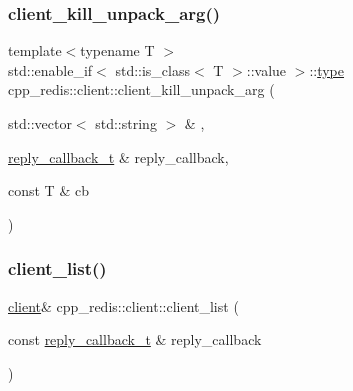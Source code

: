 \mbox{\label{classcpp__redis_1_1client_ab07713bcc08277292f6dc64ae89c1134}} 
\subsubsection{\texorpdfstring{client\+\_\+kill\+\_\+unpack\+\_\+arg()}{client\_kill\_unpack\_arg()}\hspace{0.1cm}{\footnotesize\ttfamily [4/4]}}
{\footnotesize\ttfamily template$<$typename T $>$ \\
std\+::enable\+\_\+if$<$ std\+::is\+\_\+class$<$ T $>$\+::value $>$\+::\hyperlink{classcpp__redis_1_1client_ac284ea9a5c0e95d49a675403aaf4847c}{type} cpp\+\_\+redis\+::client\+::client\+\_\+kill\+\_\+unpack\+\_\+arg (\begin{DoxyParamCaption}\item[{std\+::vector$<$ std\+::string $>$ \&}]{,  }\item[{\hyperlink{classcpp__redis_1_1client_a061a1140d36d2eaeda82b09a0bb3f9f2}{reply\+\_\+callback\+\_\+t} \&}]{reply\+\_\+callback,  }\item[{const T \&}]{cb }\end{DoxyParamCaption})\hspace{0.3cm}{\ttfamily [private]}}

\mbox{\label{classcpp__redis_1_1client_a9c2e307ab54f42ce50bdd42e1c6a363b}} 
\subsubsection{\texorpdfstring{client\+\_\+list()}{client\_list()}\hspace{0.1cm}{\footnotesize\ttfamily [1/2]}}
{\footnotesize\ttfamily \hyperlink{classcpp__redis_1_1client}{client}\& cpp\+\_\+redis\+::client\+::client\+\_\+list (\begin{DoxyParamCaption}\item[{const \hyperlink{classcpp__redis_1_1client_a061a1140d36d2eaeda82b09a0bb3f9f2}{reply\+\_\+callback\+\_\+t} \&}]{reply\+\_\+callback }\end{DoxyParamCaption})}

